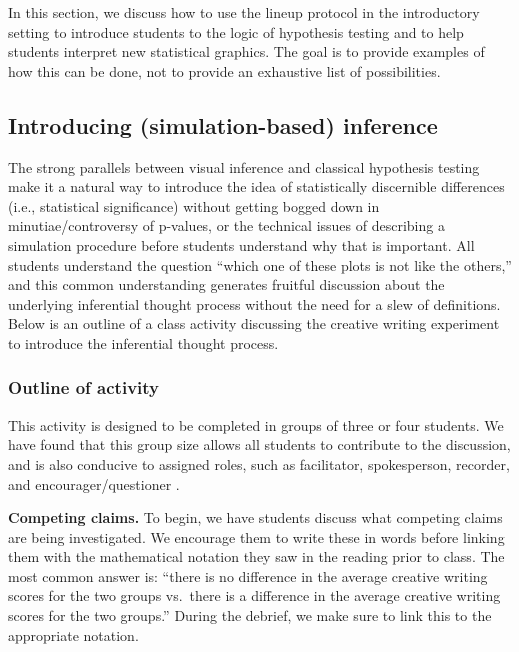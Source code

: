 \documentclass[12pt]{article}
\begin{document}
\label{sec:intro}

In this section, we discuss how to use the lineup protocol in the
introductory setting to introduce students to the logic of hypothesis
testing and to help students interpret new statistical graphics. The
goal is to provide examples of how this can be done, not to provide an
exhaustive list of possibilities.

\hypertarget{introducing-simulation-based-inference}{%
\subsection{Introducing (simulation-based)
inference}\label{introducing-simulation-based-inference}}

The strong parallels between visual inference and classical hypothesis
testing make it a natural way to introduce the idea of statistically
discernible differences (i.e., statistical significance) without getting
bogged down in minutiae/controversy of p-values, or the technical issues
of describing a simulation procedure before students understand why that
is important. All students understand the question ``which one of these
plots is not like the others,'' and this common understanding generates
fruitful discussion about the underlying inferential thought process
without the need for a slew of definitions. Below is an outline of a
class activity discussing the creative writing experiment to introduce
the inferential thought process.

\hypertarget{outline-of-activity}{%
\subsubsection{Outline of activity}\label{outline-of-activity}}

This activity is designed to be completed in groups of three or four
students. We have found that this group size allows all students to
contribute to the discussion, and is also conducive to assigned roles,
such as facilitator, spokesperson, recorder, and encourager/questioner
\citep[see][]{Garfield1993-oy, Roseth2008-xx}.

\textbf{Competing claims.} To begin, we have students discuss what
competing claims are being investigated. We encourage them to write
these in words before linking them with the mathematical notation they
saw in the reading prior to class. The most common answer is: ``there is
no difference in the average creative writing scores for the two groups
vs.~there is a difference in the average creative writing scores for the
two groups.'' During the debrief, we make sure to link this to the
appropriate notation.
\end{document}
